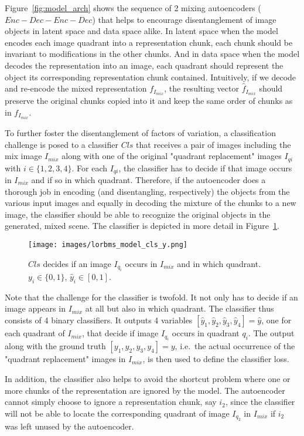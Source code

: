 \documentclass[a4paper,12pt]{report}
\begin{document}
Figure~\ref{fig:model_arch} shows the sequence of 2 mixing autoencoders ($Enc-Dec-Enc-Dec$) that helps to encourage disentanglement of image objects in latent space and data space alike. In latent space when the model encodes each image quadrant into a representation chunk, each chunk should be invariant to modifications in the other chunks. And in data space when the model decodes the representation into an image, each quadrant should represent the object its corresponding representation chunk contained. Intuitively, if we decode and re-encode the mixed representation $f_{I_{mix}}$, the resulting vector $\hat{f}_{I_{mix}}$ should preserve the original chunks copied into it and keep the same order of chunks as in $f_{I_{mix}}$.

To further foster the disentanglement of factors of variation, a classification challenge is posed to a classifier $Cls$ that receives a pair of images including the mix image $I_{mix}$ along with one of the original "quadrant replacement" images $I_{qi}$ with $i \in \{1,2,3,4\}$. For each $I_{qi}$, the classifier has to decide if that image occurs in $I_{mix}$ and if so in which quadrant. Therefore, if the autoencoder does a thorough job in encoding (and disentangling, respectively) the objects from the various input images and equally in decoding the mixture of the chunks to a new image, the classifier should be able to recognize the original objects in the generated, mixed scene. The classifier is depicted in more detail in Figure~\ref{fig:model_cls}.
\begin{figure}[ht]
\centering
\texttt{[image: images/lorbms\_model\_cls\_y.png]}
\caption{$Cls$ decides if an image $I_{q_i}$ occurs in $I_{mix}$ and in which quadrant. $y_i \in \{0,1\}$, $\hat{y}_i \in [0,1]$.}
\label{fig:model_cls}
\end{figure}
Note that the challenge for the classifier is twofold. It not only has to decide if an image appears in $I_{mix}$ at all but also in which quadrant. The classifier thus consists of 4 binary classifiers. It outputs 4 variables $[\hat{y}_1,\hat{y}_2,\hat{y}_3,\hat{y}_4] = \hat{y}$, one for each quadrant of $I_{mix}$, that decide if image $I_{q_i}$ occurs in quadrant $q_i$. The output along with the ground truth $[y_1,y_2,y_3,y_4] = y$, i.e.\ the actual occurrence of the "quadrant replacement" images in $I_{mix}$, is then used to define the classifier loss. 

In addition, the classifier also helps to avoid the shortcut problem \cite{ChallengInDisentIFoF} where one or more chunks of the representation are ignored by the model. The autoencoder cannot simply choose to ignore a representation chunk, say $i_2$, since the classifier will not be able to locate the corresponding quadrant of image $I_{q_2}$ in $I_{mix}$ if $i_2$ was left unused by the autoencoder.
\end{document}
